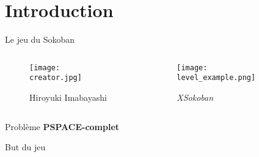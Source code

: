 



    \maketitle

    \section{Introduction}
        \begin{frame}{Le jeu du Sokoban}
            \begin{columns}
                \begin{column}{0.3\textwidth}
                    \begin{figure}
                        \centering
                        \texttt{[image: creator.jpg]}
                        \caption*{Hiroyuki Imabayashi}
                    \end{figure}
                \end{column}
                \begin{column}{0.7\textwidth}
                    \begin{figure}
                        \centering
                        \texttt{[image: level\_example.png]}
                        \caption*{\textit{XSokoban}}
                    \end{figure}
                \end{column}
            \end{columns}

            \centering
            Problème \textbf{PSPACE-complet}
        \end{frame}

        \begin{frame}{But du jeu}
            \centering
        \end{frame}

